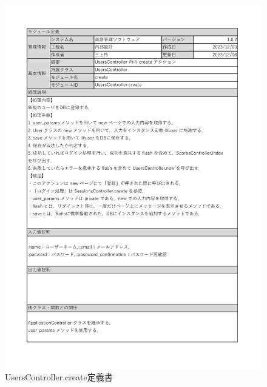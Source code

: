 \begin{figure}
    \centering
    \includegraphics[scale=0.7]{img/Users/xlsx/UsersController_create.pdf}
    \vspace{-1cm}
    \caption{UsersController.create定義書}
\end{figure}
